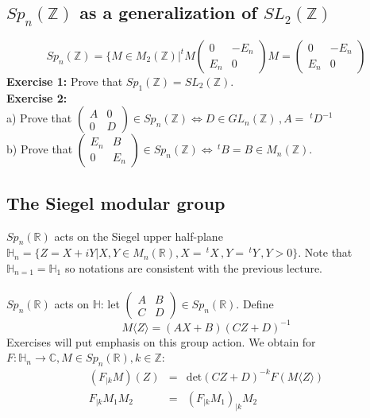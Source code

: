 \documentclass[10pt,a4paper]{article}
\begin{document}
\subsection{$Sp_n(\mathbb{Z})$ as a generalization of $SL_2(\mathbb{Z})$}
\[Sp_n(\mathbb{Z})=\{M\in M_2(\mathbb{Z})|^tM\left(\begin{array}{cc}0&-E_n\\E_n&0\end{array}\right)M=\left(\begin{array}{cc}0&-E_n\\E_n&0\end{array}\right)\]
\textbf{Exercise 1:} Prove that $Sp_1(\mathbb{Z})=SL_2(\mathbb{Z})$.\\
\textbf{Exercise 2:}\\
a) Prove that $\left(\begin{array}{cc}A&0\\0&D\end{array}\right)\in Sp_n(\mathbb{Z})\iff D\in GL_n(\mathbb{Z})\,,A=\;^tD^{-1}$\\
b) Prove that $\left(\begin{array}{cc}E_n&B\\0&E_n\end{array}\right)\in Sp_n(\mathbb{Z})\iff \,^tB=B\in M_n(\mathbb{Z})$.
\subsection{The Siegel modular group}
$Sp_n(\mathbb{R})$ acts on the Siegel upper half-plane\\ $\mathbb{H}_n=\{Z=X+iY|X,Y\in M_n(\mathbb{R}), X=\,^tX\,,Y=\,^tY\,,Y>0\}$. Note that $\mathbb{H}_{n=1}=\mathbb{H}_1$ so notations are consistent with the previous lecture.\\
\\
$Sp_n(\mathbb{R})$ acts on $\mathbb{H}$: let $\left(\begin{array}{cc}A&B\\C&D\end{array}\right)\in Sp_n(\mathbb{R})$. Define \[M\langle Z\rangle=(AX+B)(CZ+D)^{-1}\]
Exercises will put emphasis on this group action. We obtain for $F:\mathbb{H}_n\rightarrow\mathbb{C}, M\in Sp_n(\mathbb{R}), k\in\mathbb{Z}$:
\begin{eqnarray*}
(F_{|k}M)(Z)&=&\textrm{det}(CZ+D)^{-k}F(M\langle Z\rangle)\\
F_{|k}M_1M_2&=&(F_{|k}M_1)_{|k}M_2
\end{eqnarray*}
\end{document}
